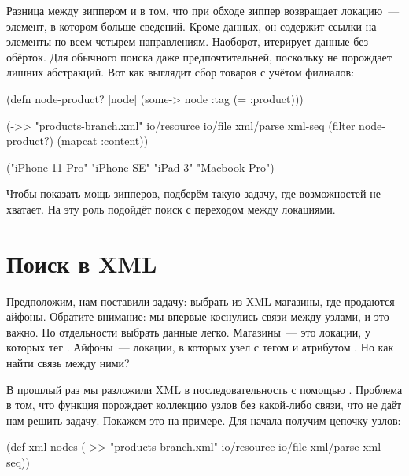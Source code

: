 Разница между зиппером и  в том, что при обходе зиппер возвращает
локацию~--- элемент, в котором больше сведений. Кроме данных, он содержит ссылки
на элементы по всем четырем направлениям. Наоборот,  итерирует
данные без обёрток. Для обычного поиска  даже предпочтительней,
поскольку не порождает лишних абстракций. Вот как выглядит сбор товаров с учётом
филиалов:

\pagebreaklarge

\begin{english}
  \begin{clojure}
(defn node-product? [node]
  (some-> node :tag (= :product)))

(->> "products-branch.xml"
     io/resource
     io/file
     xml/parse
     xml-seq
     (filter node-product?)
     (mapcat :content))

("iPhone 11 Pro" "iPhone SE" "iPad 3" "Macbook Pro")
  \end{clojure}
\end{english}

Чтобы показать мощь зипперов, подберём такую задачу, где возможностей 
не хватает. На эту роль подойдёт поиск с переходом между локациями.

\section{Поиск в XML}


Предположим, нам поставили задачу: выбрать из XML магазины, где продаются
айфоны. Обратите внимание: мы впервые коснулись связи между узлами, и это
важно. По отдельности выбрать данные легко. Магазины~--- это локации, у которых
тег . Айфоны~--- локации, в которых узел с тегом  и
атрибутом . Но как найти связь между ними?

В прошлый раз мы разложили XML в последовательность с помощью
. Проблема в том, что функция порождает коллекцию узлов без какой-либо
связи, что не даёт нам решить задачу. Покажем это на примере. Для начала получим
цепочку узлов:

\begin{english}
  \begin{clojure}
(def xml-nodes
  (->> "products-branch.xml"
       io/resource
       io/file
       xml/parse
       xml-seq))
  \end{clojure}
\end{english}

